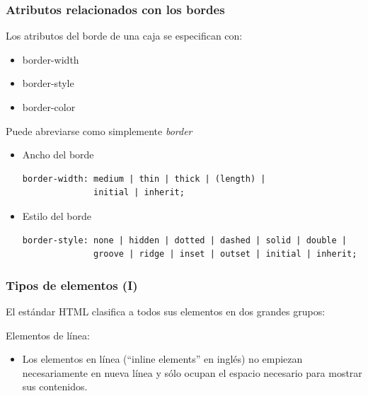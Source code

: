 \documentclass[ucs]{beamer}
\begin{document}
\begin{frame}[fragile]
\frametitle{Atributos relacionados con los bordes}


Los atributos del borde de una caja se especifican con:

    \begin{itemize}
    \item
border-width

    \item
border-style

    \item
border-color
    \end{itemize}

Puede abreviarse como simplemente \emph{border}



\begin{itemize}
\item
Ancho del borde


  \begin{footnotesize}
  \begin{verbatim}
border-width: medium | thin | thick | (length) | 
              initial | inherit;
  \end{verbatim}
  \end{footnotesize}


\item
Estilo del borde

  \begin{footnotesize}
  \begin{verbatim}
border-style: none | hidden | dotted | dashed | solid | double |
              groove | ridge | inset | outset | initial | inherit;
  \end{verbatim}
  \end{footnotesize}



\end{itemize}

\end{frame}






\begin{frame}
\frametitle{Tipos de elementos (I)}

El estándar HTML clasifica a todos sus elementos en dos grandes grupos:

Elementos de línea:

\begin{itemize}
  \item Los elementos en línea (``inline elements'' en inglés) no empiezan necesariamente en nueva línea y sólo ocupan el espacio necesario para mostrar sus contenidos.

\end{itemize}

\end{frame}
\end{document}
